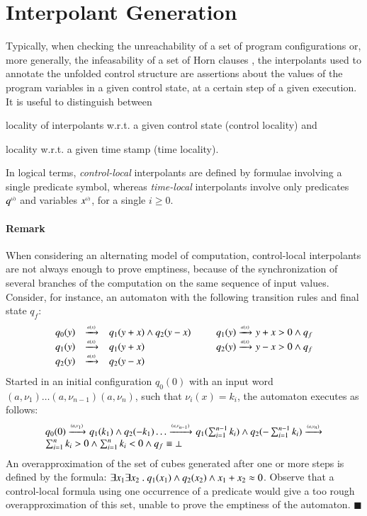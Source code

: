 \documentclass{llncs}
\begin{document}
\section{Interpolant Generation}\label{sec:interpolants}

Typically, when checking the unreachability of a set of program
configurations or, more generally, the infeasability of a set of Horn
clauses \cite{BjornerGurfinkelMcMillanRybalchenko15}, the interpolants
used to annotate the unfolded control structure are assertions about
the values of the program variables in a given control state, at a
certain step of a given execution. It is useful to distinguish between
\begin{inparaenum}[(i)]
\item locality of interpolants w.r.t. a given control state (control
  locality) and
%
\item locality w.r.t. a given time stamp (time locality).
\end{inparaenum} 
In logical terms, \emph{control-local} interpolants are defined by
formulae involving a single predicate symbol, whereas
\emph{time-local} interpolants involve only predicates ${q}^{\scriptscriptstyle{({i})}}$
and variables ${x}^{\scriptscriptstyle{({i})}}$, for a single $i \geq 0$.

\paragraph{Remark}
When considering an alternating model of computation, control-local
interpolants are not always enough to prove emptiness, because of the
synchronization of several branches of the computation on the same
sequence of input values. Consider, for instance, an automaton with
the following transition rules and final state $q_f$:
\[\begin{array}{rclcrcl}
q_0(y) & \xrightarrow{{\scriptscriptstyle a(x)}}_{{\scriptstyle }} & q_1(y+x) \wedge q_2(y-x) & \hspace*{2mm} & 
q_1(y) \xrightarrow{{\scriptscriptstyle a(x)}}_{{\scriptstyle }} y+x > 0 \wedge q_f \\
q_1(y) & \xrightarrow{{\scriptscriptstyle a(x)}}_{{\scriptstyle }} & q_1(y+x) && q_2(y) \xrightarrow{{\scriptscriptstyle a(x)}}_{{\scriptstyle }} y-x > 0 \wedge q_f \\
q_2(y) & \xrightarrow{{\scriptscriptstyle a(x)}}_{{\scriptstyle }} & q_2(y-x)
\end{array}\]
Started in an initial configuration $q_0(0)$ with an input word
$(a,\nu_1) \ldots (a,\nu_{n-1}) (a,\nu_n)$, such that $\nu_i(x)=k_i$,
the automaton executes as follows:
\[\begin{array}{l}
q_0(0) \xrightarrow{{\scriptscriptstyle (a,\nu_1)}}_{{\scriptstyle }} q_1(k_1)
\wedge q_2(-k_1) \ldots \xrightarrow{{\scriptscriptstyle (a,\nu_{n-1})}}_{{\scriptstyle }} 
q_1(\sum_{i=1}^{n-1} k_i) \wedge q_2(-\sum_{i=1}^{n-1} k_i) \xrightarrow{{\scriptscriptstyle (a,\nu_n)}}_{{\scriptstyle }} \\
\sum_{i=1}^{n} k_i > 0 \wedge \sum_{i=1}^{n} k_i < 0 \wedge q_f \equiv \bot
\end{array}\] 
An overapproximation of the set of cubes generated after one or more
steps is defined by the formula: $\exists x_1 \exists x_2 ~.~ q_1(x_1)
\wedge q_2(x_2) \wedge x_1+x_2 \approx 0$. Observe that a control-local
formula using one occurrence of a predicate would give a too rough
overapproximation of this set, unable to prove the emptiness of the
automaton. \hfill$\blacksquare$
\end{document}
